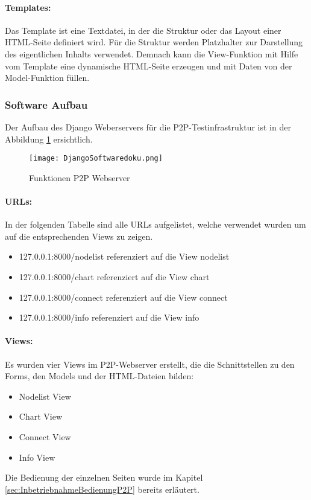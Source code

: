 \paragraph{Templates: }\label{par:1Templates}
Das Template ist eine Textdatei, in der die Struktur oder das Layout einer HTML-Seite definiert wird. Für die Struktur werden Platzhalter zur Darstellung des eigentlichen Inhalts  verwendet. Demnach kann die View-Funktion mit Hilfe vom Template eine dynamische HTML-Seite erzeugen und mit Daten von der Model-Funktion füllen.

\newpage
\subsubsection{Software Aufbau}\label{subsubsec:SoftwareAufbau}
Der Aufbau des Django Weberservers für die P2P-Testinfrastruktur ist in der Abbildung \ref{fig:FunktionenP2PWebserver} ersichtlich.
\begin{figure} [H]
	\centering
	\texttt{[image: DjangoSoftwaredoku.png]}
	\caption{Funktionen P2P Webserver}
	\label{fig:FunktionenP2PWebserver}
\end{figure}


\paragraph{URLs: }\label{par:2URLs}
In der folgenden Tabelle sind alle URLs aufgelistet, welche verwendet wurden um auf die entsprechenden Views zu zeigen.
\begin{itemize}
	\item 127.0.0.1:8000/node\textunderscore list \hspace{2.5mm} referenziert auf die View node\textunderscore list
	\item 127.0.0.1:8000/chart \hspace{10mm} referenziert auf die View chart
	\item 127.0.0.1:8000/connect \hspace{6mm} referenziert auf die View connect
	\item 127.0.0.1:8000/info \hspace{12.5mm} referenziert auf die View info
\end{itemize} 

\vspace{5mm}
\paragraph{Views:}\label{par:2Views}
Es wurden vier Views im P2P-Webserver erstellt, die die Schnittstellen zu den Forms, den Models und der HTML-Dateien bilden:
\begin{itemize}
	\item Node\textunderscore list View
	\item Chart View
	\item Connect View
	\item Info View
\end{itemize} 
Die Bedienung der einzelnen Seiten wurde im Kapitel \ref{sec:InbetriebnahmeBedienungP2P} bereits erläutert.

